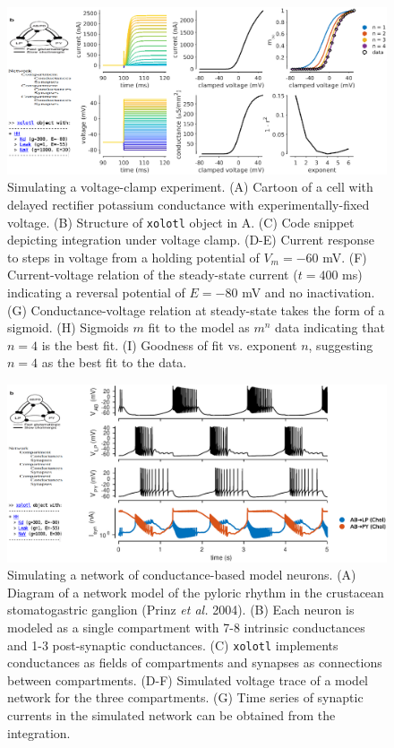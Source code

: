 \documentclass{frontiersSCNS} %
\begin{document}
\begin{figure}
	\centering
	\includegraphics[width=1.0\linewidth]{gfx/figure_clamp}
	\caption{Simulating a voltage-clamp experiment. (A) Cartoon of a cell with delayed rectifier potassium conductance \autocite{liuModelNeuronActivitydependent1998} with experimentally-fixed voltage. (B) Structure of \texttt{xolotl} object in A. (C) Code snippet depicting integration under voltage clamp. (D-E) Current response to steps in voltage from a holding potential of $V_m = -60$ mV. (F) Current-voltage relation of the steady-state current ($t = 400$ ms) indicating a reversal potential of $E = -80$ mV and no inactivation. (G) Conductance-voltage relation at steady-state takes the form of a sigmoid. (H) Sigmoids $m$ fit to the model as $m^n$ data indicating that $n=4$ is the best fit. (I) Goodness of fit vs. exponent $n$, suggesting $n=4$ as the best fit to the data.}
	\label{fig:figureclamp}
\end{figure}

\begin{figure}
	\centering
	\includegraphics[width=1.0\linewidth]{gfx/figure_network}
	\caption{Simulating a network of conductance-based model neurons. (A) Diagram of a network model of the pyloric rhythm in the crustacean stomatogastric ganglion (Prinz \textit{et al.} 2004). (B) Each neuron is modeled as a single compartment with 7-8 intrinsic conductances and 1-3 post-synaptic conductances. (C) \texttt{xolotl} implements conductances as fields of compartments and synapses as connections between compartments. (D-F) Simulated voltage trace of a model network for the three compartments. (G) Time series of synaptic currents in the simulated network can be obtained from the integration.}
	\label{fig:figurenetwork}
\end{figure}
\end{document}
